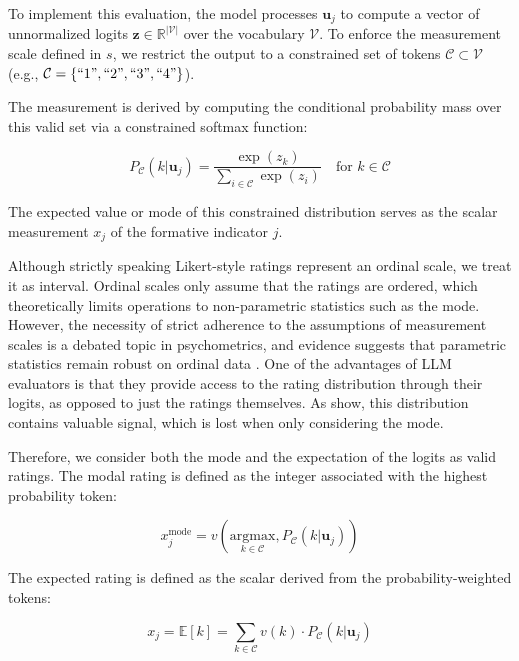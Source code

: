 To implement this evaluation, the model processes $\mathbf{u}_j$ to compute a vector of unnormalized logits $\mathbf{z} \in \mathbb{R}^{|\mathcal{V}|}$ over the vocabulary $\mathcal{V}$. To enforce the measurement scale defined in $s$, we restrict the output to a constrained set of tokens $\mathcal{C} \subset \mathcal{V}$ (e.g., $\mathcal{C} = \{``1", ``2", ``3", ``4"\}$).

The measurement is derived by computing the conditional probability mass over this valid set via a constrained softmax function:

\begin{equation}
    P_{\mathcal{C}}(k | \mathbf{u}_j) = \frac{\exp(z_k)}{\sum_{i \in \mathcal{C}} \exp(z_i)} \quad \text{for } k \in \mathcal{C}
\end{equation}

The expected value or mode of this constrained distribution serves as the scalar measurement $x_j$ of the formative indicator $j$. 

Although strictly speaking Likert-style ratings represent an ordinal scale, we treat it as interval. Ordinal scales only assume that the ratings are ordered, which theoretically limits operations to non-parametric statistics such as the mode. However, the necessity of strict adherence to the assumptions of measurement scales is a debated topic in psychometrics, and evidence suggests that parametric statistics remain robust on ordinal data \citep{norman2010likert}. One of the advantages of LLM evaluators is that they provide access to the rating distribution through their logits, as opposed to just the ratings themselves. As \citet{liu_g-eval_2023} show, this distribution contains valuable signal, which is lost when only considering the mode. 

Therefore, we consider both the mode and the expectation of the logits as valid ratings. The modal rating is defined as the integer associated with the highest probability token:

\begin{equation} 
    x_j^{\text{mode}} = v\left(\underset{k \in \mathcal{C}}{\mathrm{argmax}} , P_{\mathcal{C}}(k | \mathbf{u}_j)\right) 
\end{equation}

The expected rating is defined as the scalar derived from the probability-weighted tokens:

\begin{equation} 
    x_j = \mathbb{E}[k] = \sum_{k \in \mathcal{C}} v(k) \cdot P_{\mathcal{C}}(k | \mathbf{u}_j) 
\end{equation}

